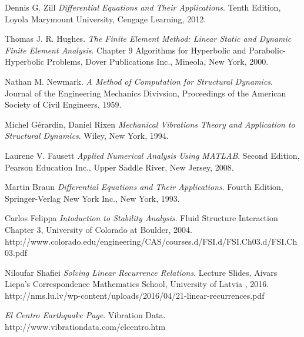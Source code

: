 \documentclass{article}
\begin{document}
\begin{thebibliography}{9}

Dennis G. Zill
\textit{Differential Equations and Their Applications}. 
Tenth Edition, Loyola Marymount University, Cengage Learning, 2012.

Thomas J. R. Hughes.
\textit{The Finite Element Method: Linear Static and Dynamic Finite Element Analysis}. 
Chapter 9 Algorithms for Hyperbolic and Parabolic-Hyperbolic Problems, Dover Publications Inc., Mineola, New York, 2000.

Nathan M. Newmark.
\textit{A Method of Computation for Structural Dynamics}. 
Journal of the Engineering Mechanics Divivsion, Proceedings of the American Society of Civil Engineers, 1959.

Michel G\'{e}rardin, Daniel Rixen
\textit{Mechanical Vibrations Theory and Application to Structural Dynamics}. 
Wiley, New York, 1994.

Laurene V. Fausett
\textit{Applied Numerical Analysis Using MATLAB}. 
Second Edition, Pearson Education Inc., Upper Saddle River, New Jersey, 2008.

Martin Braun
\textit{Differential Equations and Their Applications}. 
Fourth Edition, Springer-Verlag New York Inc., New York, 1993.

Carlos Felippa
\textit{Intoduction to Stability Analysis}. 
Fluid Structure Interaction Chapter 3, University of Colorado at Boulder, 2004.\newline
http://www.colorado.edu/engineering/CAS/courses.d/FSI.d/FSI.Ch03.d/FSI.Ch03.pdf

Niloufar Shafiei
\textit{Solving Linear Recurrence Relations}. 
Lecture Slides, Aivars Liepa’s Correspondence Mathematics School, University of Latvia , 2016.\newline
http://nms.lu.lv/wp-content/uploads/2016/04/21-linear-recurrences.pdf

\textit{El Centro Earthquake Page}. 
Vibration Data.\newline
http://www.vibrationdata.com/elcentro.htm

\end{thebibliography}
\end{document}
